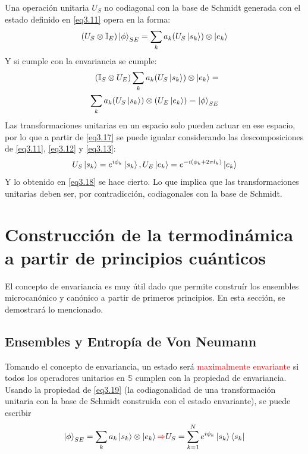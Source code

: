 \documentclass{book}
\begin{document}
Una operación unitaria $U_S$ no codiagonal con la base de Schmidt generada con el estado definido en \ref{eq3.11} opera en la forma:
\begin{equation}\label{eq3.17} (U_S\otimes\mathbb{I}_E)\ket{\phi}_{SE}=\sum_k a_k(U_S\ket{s_k})\otimes\ket{e_k}\end{equation}
Y si cumple con la envariancia se cumple:
\begin{equation}\label{eq3.18} \begin{aligned} (\mathbb{I}_S\otimes U_E)\sum_k a_k(U_S\ket{s_k})\otimes\ket{e_k}= \\ \sum_k a_k (U_S\ket{s_k})\otimes (U_E\ket{e_k})=\ket{\phi}_{SE} \end{aligned} \end{equation}
Las transformaciones unitarias en un espacio solo pueden actuar en ese espacio, por lo que a partir de \ref{eq3.17} se puede igualar considerando las descomposiciones de \ref{eq3.11}, \ref{eq3.12} y \ref{eq3.13}:
\begin{equation}\label{eq3.19} U_S\ket{s_k}=e^{i\phi_k}\ket{s_k}, U_E\ket{e_k}=e^{-i(\phi_k+2\pi l_k)}\ket{e_k} \end{equation}
Y lo obtenido en \ref{eq3.18} se hace cierto. Lo que implica que las transformaciones unitarias deben ser, por contradicción, codiagonales con la base de Schmidt. 
 

\section{Construcción de la termodinámica a partir de principios cuánticos}
El concepto de envariancia es muy útil dado que permite construír los ensembles microcanónico y canónico a partir de primeros principios. En esta sección, se demostrará lo mencionado.
\subsection{Ensembles y Entropía de Von Neumann}
Tomando el concepto de envariancia, un estado será \textcolor{red}{maximalmente envariante} si todos los operadores unitarios en $\mathbb{S}$ cumplen con la propiedad de envariancia. Usando la propiedad de \ref{eq3.19} (la codiagonalidad de una transformación unitaria con la base de Schmidt construida con el estado envariante), se puede escribir
\begin{equation}\label{eq3.20} \ket{\phi}_{SE}=\sum_k a_k\ket{s_k}\otimes\ket{e_k}\textcolor{red}{\Rightarrow} U_S=\sum_{k=1}^N e^{i\phi_k}\ket{s_k}\bra{s_k} \end{equation}
\end{document}
